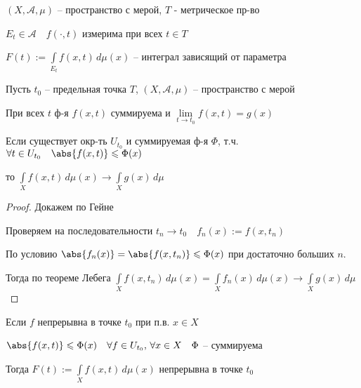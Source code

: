 
\begin{definition}\thmslashn
	
	$(X, \mathcal{A}, \mu)$ -- пространство с  мерой, $T$ - метрическое пр-во
	
	$E_t \in \mathcal{A} \quad f(\cdot, t)$ измерима при всех $t \in T$
	
	$F(t):= \int\limits_{E_t} f(x, t) \,d\mu (x)$ -- интеграл зависящий от параметра
	
\end{definition}

\begin{theorem}\thmslashn
	
	Пусть $t_0$ -- предельная точка $T$, $(X, \mathcal{A}, \mu)$ -- пространство с  мерой
	
	При всех $t$ ф-я $f(x, t)$ суммируема и $\lim\limits_{t\to t_0}f(x, t) = g(x)$
	
	Если существует окр-ть $U_{t_0}$ и суммируемая ф-я $\Phi$, т.ч. $\forall t \in U_{t_0}\quad \abs{f(x, t)} \leqslant \Phi(x)$
	
	то $\int\limits_{X} f(x, t) \,d\mu (x) \to \int\limits_{X} g(x)\,d\mu$
	
\end{theorem}

\begin{proof}\thmslashn
	
	Докажем по Гейне
	
	Проверяем на последовательности $t_n \to t_0 \quad f_n(x) := f(x, t_n)$
	
	По условию $\abs{f_n(x)} = \abs{f(x, t_n)} \leqslant \Phi(x)$ при достаточно больших $n$. 
	
	Тогда по теореме Лебега $\int\limits_{X} f(x, t_n) \,d\mu (x) = \int\limits_{X} f_n(x) \,d\mu (x)\to \int\limits_{X} g(x)\,d\mu$ 
	
\end{proof}

\begin{consequence}\thmslashn
	
	Если $f$ непрерывна в точке $t_0$ при п.в. $x \in X$
	
	$\abs{f(x, t)} \leqslant \Phi(x) \quad \forall f\in U_{t_0},\, \forall x \in X \quad \Phi$ -- суммируема
	
	Тогда $F(t) := \int\limits_{X} f(x, t) \,d\mu (x)$ непрерывна в точке $t_0$
	
\end{consequence}

